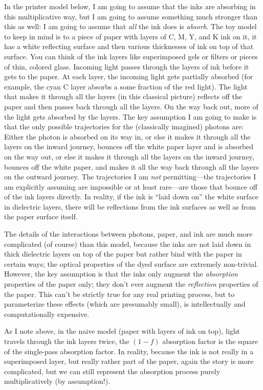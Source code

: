 \documentclass[letterpaper,preprint,dvipdf]{aastex}
\begin{document}
In the printer model below, I am going to assume that the inks are
absorbing in this multiplicative way, but I am going to assume
something much stronger than this as well: I am going to assume that
\emph{all} the ink does is \emph{absorb}.  The toy model to keep in
mind is to a piece of paper with layers of C, M, Y, and K ink on it,
it has a white reflecting surface and then various thicknesses of ink
on top of that surface.  You can think of the ink layers like
superimposed gels or filters or pieces of thin, colored glass.
Incoming light passes through the layers of ink before it gets to the
paper.  At each layer, the incoming light gets partially absorbed (for
example, the cyan C layer absorbs a some fraction of the red light).
The light that makes it through all the layers (in this classical
picture) reflects off the paper and then passes back through all the
layers.  On the way back out, more of the light gets absorbed by the
layers.  The key assumption I am going to make is that the only
possible trajectories for the (classically imagined) photons are:
Either the photon is absorbed on its way in, or else it makes it
through all the layers on the inward journey, bounces off the white
paper layer and is absorbed on the way out, or else it makes it
through all the layers on the inward journey, bounces off the white
paper, and makes it all the way back through all the layers on the
outward journey.  The trajectories I am \emph{not} permitting---the
trajectories I am explicitly assuming are impossible or at least
rare---are those that bounce off of the ink layers directly.  In
reality, if the ink is ``laid down on'' the white surface in
dielectric layers, there will be reflections from the ink surfaces as
well as from the paper surface itself.

The details of the interactions between photons, paper, and ink are
much more complicated (of course) than this model, because the inks
are not laid down in thick dielectric layers on top of the paper but
rather bind with the paper in certain ways; the optical properties of
the dyed surface are extremely non-trivial.  However, the key
assumption is that the inks only augment the \emph{absorption}
properties of the paper only; they don't ever augment the
\emph{reflection} properties of the paper.  This can't be strictly
true for any real printing process, but to parameterize these effects
(which are presumably small), is intellectually and computationally
expensive.

As I note above, in the naive model (paper with layers of ink on
top), light travels through the ink layers twice, the $(1-f)$
absorption factor is the square of the single-pass absorption factor.
In reality, because the ink is not really in a superimposed layer, but
really rather part of the paper, again the story is more complicated,
but we can still represent the absorption process purely
multiplicatively (by assumption!).
\end{document}

